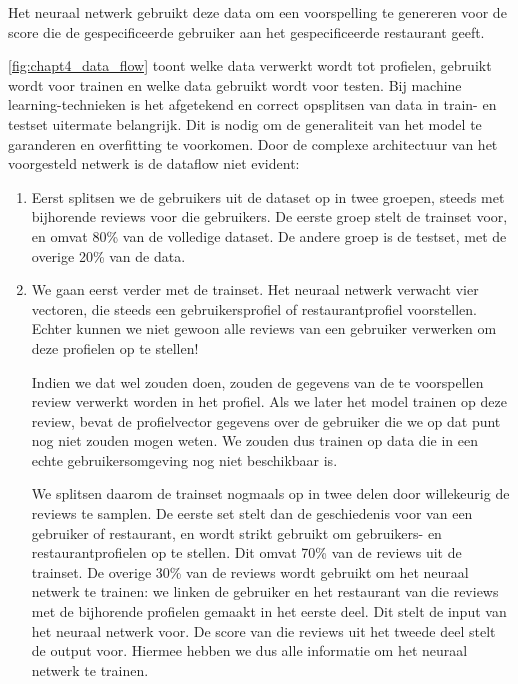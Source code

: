 Het neuraal netwerk gebruikt deze data om een voorspelling te genereren voor de score die de gespecificeerde gebruiker aan het gespecificeerde restaurant geeft.

\autoref{fig:chapt4_data_flow} toont welke data verwerkt wordt tot profielen, gebruikt wordt voor trainen en welke data gebruikt wordt voor testen. Bij machine learning-technieken is het afgetekend en correct opsplitsen van data in train- en testset uitermate belangrijk. Dit is nodig om de generaliteit van het model te garanderen en overfitting te voorkomen. Door de complexe architectuur van het voorgesteld netwerk is de dataflow niet evident:

\begin{enumerate}
    \item Eerst splitsen we de gebruikers uit de dataset op in twee groepen, steeds met bijhorende reviews voor die gebruikers. De eerste groep stelt de trainset voor, en omvat 80\% van de volledige dataset. De andere groep is de testset, met de overige 20\% van de data.
    \item We gaan eerst verder met de trainset. Het neuraal netwerk verwacht vier vectoren, die steeds een gebruikersprofiel of restaurantprofiel voorstellen. Echter kunnen we niet gewoon alle reviews van een gebruiker verwerken om deze profielen op te stellen! 
    
    Indien we dat wel zouden doen, zouden de gegevens van de te voorspellen review verwerkt worden in het profiel. Als we later het model trainen op deze review, bevat de profielvector gegevens over de gebruiker die we op dat punt nog niet zouden mogen weten. We zouden dus trainen op data die in een echte gebruikersomgeving nog niet beschikbaar is.

    We splitsen daarom de trainset nogmaals op in twee delen door willekeurig de reviews te samplen. De eerste set stelt dan de geschiedenis voor van een gebruiker of restaurant, en wordt strikt gebruikt om gebruikers- en restaurantprofielen op te stellen. Dit omvat 70\% van de reviews uit de trainset.\newline
    De overige 30\% van de reviews wordt gebruikt om het neuraal netwerk te trainen: we linken de gebruiker en het restaurant van die reviews met de bijhorende profielen gemaakt in het eerste deel. Dit stelt de input van het neuraal netwerk voor. De score van die reviews uit het tweede deel stelt de output voor. Hiermee hebben we dus alle informatie om het neuraal netwerk te trainen. 


\end{enumerate}
